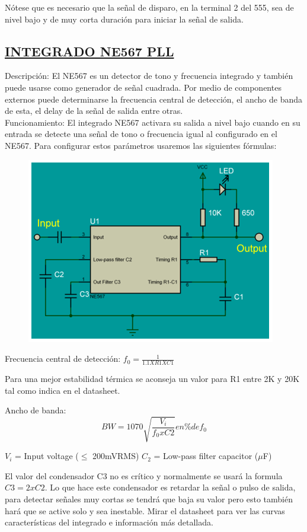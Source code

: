 \documentclass[a4paper,11pt]{article}
\begin{document}
Nótese que es necesario que la señal de disparo, en la terminal 2 del 555, sea de nivel bajo y de muy corta duración para iniciar la señal de salida.

\subsection{\underline{INTEGRADO NE567 PLL}}
Descripción:
El NE567 es un detector de tono y frecuencia integrado y también puede usarse como generador de señal cuadrada. Por medio de componentes externos puede determinarse la frecuencia central de detección, el ancho de banda de esta, el delay de la señal de salida entre otras. \\

Funcionamiento:
El integrado NE567 activara su salida a nivel bajo cuando en su entrada se detecte una señal de tono o frecuencia igual al configurado en el NE567. Para configurar estos parámetros usaremos las siguientes fórmulas:

	\begin{figure}[h]
		\centering
		\includegraphics[width=0.7\linewidth]{./9}
	\end{figure}
	
Frecuencia central de detección: $f_0 = \frac{1}{1.1 X R1 X C1}$

Para una mejor estabilidad térmica se aconseja un valor para R1 entre 2K y 20K tal como indica en el datasheet.

Ancho de banda: $$BW	= 1070 \sqrt{\frac{V_i}{f_0 x C2}}en \% de f_0 $$

$V_i$ = Input voltage ($\leq$ 200mVRMS) 
$C_2$ = Low-pass filter capacitor ($\mu$F)

El valor del condensador C3 no es crítico y normalmente se usará la formula  $C3 = 2xC2$. Lo que hace este condensador es retardar la señal o pulso de salida, para detectar señales muy cortas se tendrá que baja su valor pero esto también hará que se active solo y sea inestable.
Mirar el datasheet para ver las curvas características del integrado e información más detallada. \\
\end{document}
